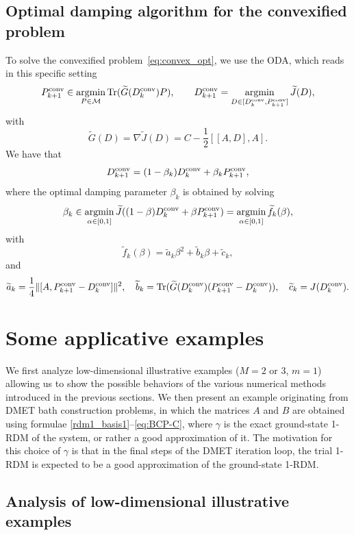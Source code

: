 \documentclass{article}
\newcommand{\tr}{{\rm Tr}}
\newcommand{\1}{{\mathds 1}}
\begin{document}
\subsection{Optimal damping algorithm for the convexified problem}
\label{sec:convex_num}

To solve the convexified problem~\eqref{eq:convex_opt}, we use the ODA, which reads in this specific setting
\begin{equation}
P_{k+1}^{\rm conv} \in \mathop{\rm argmin}_{P \in \mathcal M} \tr(\widetilde G(D_k^{\rm conv})P), \qquad D_{k+1}^{\rm conv}=\mathop{\rm argmin}_{D \in [D_k^{\rm conv},P_{k+1}^{\rm conv}]} \widetilde J(D), \label{eq:ODA_conv}
\end{equation}
with 
$$
\widetilde G(D) = \nabla \widetilde J(D) = C- \frac 12[[A,D],A].
$$
We have that
$$
D_{k+1}^{\rm conv}=(1-\beta_k) D_{k}^{\rm conv}+\beta_k P_{k+1}^{\rm conv},
$$
where the optimal damping parameter $\beta_k$ is obtained by solving
$$
\beta_k \in \mathop{\rm argmin}_{\alpha \in [0,1]} \widetilde J((1-\beta) D_{k}^{\rm conv}+\beta P_{k+1}^{\rm conv})= \mathop{\rm argmin}_{\alpha \in [0,1]} \widetilde f_k(\beta),
$$
with 
$$
\widetilde f_k(\beta) = \widetilde a_k \beta^2 + \widetilde b_k \beta + \widetilde c_k,
$$
and
$$
\widetilde a_k= \frac 14 \| [A,P_{k+1}^{\rm conv}-D_{k}^{\rm conv}] \|^2 , \quad \widetilde b_k=\tr(\widetilde G(D_k^{\rm conv})(P_{k+1}^{\rm conv}-D_{k}^{\rm conv})), \quad \widetilde c_k= J(D_{k}^{\rm conv}).
$$

\section{Some applicative examples}
\label{sec:numerics}


We first analyze low-dimensional illustrative examples ($M=2$ or $3$, $m=1$) allowing us to show the possible behaviors of the various numerical methods introduced in the previous sections. We then present an example originating from DMET bath construction problems, in which the matrices $A$ and $B$ are obtained using formulae \eqref{rdm1_basis1}--\eqref{eq:BCP-C}, where $\gamma$ is the exact ground-state 1-RDM of the system, or rather a good approximation of it. The motivation for this choice of $\gamma$ is that in the final steps of the DMET iteration loop, the trial 1-RDM is expected to be a good approximation of the ground-state 1-RDM.


\subsection{Analysis of low-dimensional illustrative examples}
\label{sec:random}
\end{document}
